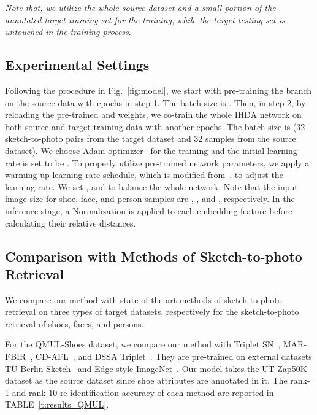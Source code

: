 \documentclass[journal]{IEEEtran}
\begin{document}
\emph{Note that, we utilize the whole source dataset and a small portion of the annotated target training set for the training, while the target testing set is untouched in the training process}.


\subsection{Experimental Settings}
Following the procedure in Fig.~\ref{fig:model}, we start with pre-training the  branch on the source data with  epochs in step 1. The batch size is . Then, in step 2, by reloading the pre-trained  and  weights, we co-train the whole IHDA network on both source and target training data with another  epochs. The batch size is  (32 sketch-to-photo pairs from the target dataset and 32 samples from the source dataset). We choose Adam optimizer~\cite{kingma2014adam} for the training and the initial learning rate is set to be . To properly utilize pre-trained network parameters, we apply a warming-up learning rate schedule, which is modified from~\cite{Luo_2019_Strong_TMM}, to adjust the learning rate. We set ,  and  to balance the whole network. Note that the input image size for shoe, face, and person samples are , , and , respectively. In the inference stage, a  Normalization is applied to each embedding feature before calculating their relative distances. 


\subsection{Comparison with Methods of Sketch-to-photo Retrieval}

We compare our method with state-of-the-art methods of sketch-to-photo retrieval on three types of target datasets, respectively for the sketch-to-photo retrieval of shoes, faces, and persons. 

For the QMUL-Shoes dataset, we compare our method with Triplet SN~\cite{yu2016sketch}, MAR-FBIR~\cite{song2016deep}, CD-AFL~\cite{pang2018cross}, and DSSA Triplet~\cite{song2017deep}. They are pre-trained on external datasets TU Berlin Sketch~\cite{eitz2012sbsr} and Edge-style ImageNet~\cite{russakovsky2015imagenet}. Our model takes the UT-Zap50K dataset as the source dataset since shoe attributes are annotated in it. The rank-1 and rank-10 re-identification accuracy of each method are reported in TABLE~\ref{t:results_QMUL}.
\end{document}
